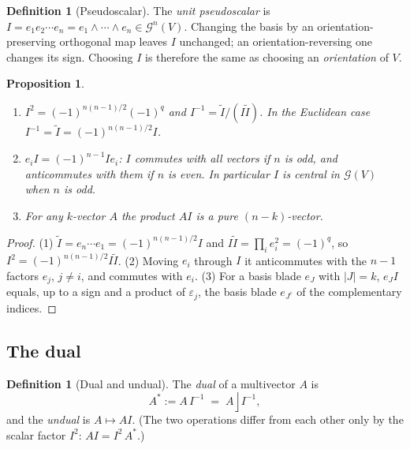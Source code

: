 \documentclass[11pt,a4paper]{article}
\newcounter{thm}[section]
\numberwithin{equation}{section}
\theoremstyle{definition}
\newtheorem{definition}[thm]{Definition}
\theoremstyle{plain}
\newtheorem{proposition}[thm]{Proposition}
\newcommand{\GA}{\mathcal{G}}
\newcommand{\rev}[1]{\widetilde{#1}}
\newcommand{\lc}{\mathbin{\rfloor}}
\newcommand{\pss}{I}
\newcommand{\dual}[1]{#1^{\ast}}
\begin{document}
\begin{definition}[Pseudoscalar]
The \emph{unit pseudoscalar} is $\pss=e_1e_2\cdots e_n=e_1\wedge\cdots\wedge e_n\in\GA^n(V)$. Changing the basis by an orientation-preserving orthogonal map leaves $\pss$ unchanged; an orientation-reversing one changes its sign. Choosing $\pss$ is therefore the same as choosing an \emph{orientation} of $V$.
\end{definition}

\begin{proposition}\label{prop:pss}
\begin{enumerate}
  \item $\pss^2=(-1)^{n(n-1)/2}(-1)^q$ and $\pss^{-1}=\rev\pss/(\pss\rev\pss)$. In the Euclidean case $\pss^{-1}=\rev\pss=(-1)^{n(n-1)/2}\pss$.
  \item $e_i\pss=(-1)^{n-1}\pss e_i$: $\pss$ commutes with all vectors if $n$ is odd, and anticommutes with them if $n$ is even. In particular $\pss$ is central in $\GA(V)$ when $n$ is odd.
  \item For any $k$-vector $A$ the product $A\pss$ is a pure $(n-k)$-vector.
\end{enumerate}
\end{proposition}
\begin{proof}
(1) $\rev\pss=e_n\cdots e_1=(-1)^{n(n-1)/2}\pss$ and $\pss\rev\pss=\prod_i e_i^2=(-1)^q$, so $\pss^2=(-1)^{n(n-1)/2}\pss\rev\pss$. (2) Moving $e_i$ through $\pss$ it anticommutes with the $n-1$ factors $e_j$, $j\neq i$, and commutes with $e_i$. (3) For a basis blade $e_J$ with $|J|=k$, $e_J\pss$ equals, up to a sign and a product of $\varepsilon_j$, the basis blade $e_{J^c}$ of the complementary indices.
\end{proof}

\subsection{The dual}

\begin{definition}[Dual and undual]\label{def:dual}
The \emph{dual} of a multivector $A$ is
\[
 \dual A:=A\,\pss^{-1}\;=\;A\lc\pss^{-1},
\]
and the \emph{undual} is $A\mapsto A\pss$. (The two operations differ from each other only by the scalar factor $\pss^{2}$: $A\pss=\pss^2\,\dual A$.)
\end{definition}
\end{document}
